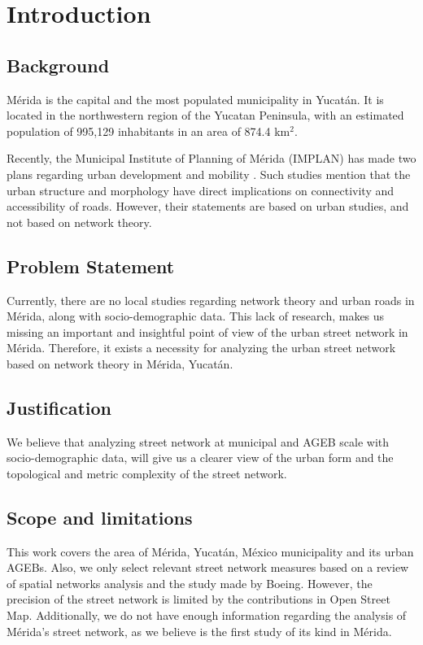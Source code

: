 \chapter{Introduction}
\label{cha:introduction}

\section{Background}

Mérida is the capital and the most populated municipality in Yucatán. It is located in the northwestern region of the Yucatan Peninsula, with an estimated population of 995,129 inhabitants in an area of 874.4 km$^2$.

Recently, the Municipal Institute of Planning of Mérida (IMPLAN) has made two plans regarding urban development and mobility \cite{PMDU_2017, PIMUS_2019}. Such studies mention that the urban structure and morphology have direct implications on connectivity and accessibility of roads. However, their statements are based on urban studies, and not based on network theory.

\section{Problem Statement} 

Currently, there are no local studies regarding network theory and urban roads in Mérida, along with socio-demographic data. This lack of research, makes us missing an important and insightful point of view of the urban street network in Mérida. Therefore, it exists a necessity for analyzing the urban street network based on network theory in Mérida, Yucatán.

\section{Justification}

We believe that analyzing street network at municipal and AGEB scale with socio-demographic data, will give us a clearer view of the urban form and the topological and metric complexity of the street network. 


\section{Scope and limitations}

This work covers the area of Mérida, Yucatán, México municipality and its urban AGEBs. Also, we only select relevant street network measures based on a review of spatial networks analysis and the study \cite{boeing_multi-scale_2018} made by Boeing. However, the precision of the street network is limited by the contributions in Open Street Map. Additionally, we do not have enough information regarding the analysis of Mérida's street network, as we believe is the first study of its kind in Mérida.

